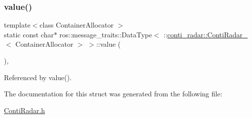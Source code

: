 \subsubsection{\texorpdfstring{value()}{value()}\hspace{0.1cm}{\footnotesize\ttfamily [2/2]}}
{\footnotesize\ttfamily template$<$class Container\+Allocator $>$ \\
static const char$\ast$ ros\+::message\+\_\+traits\+::\+Data\+Type$<$ \+::\hyperlink{structconti__radar_1_1ContiRadar__}{conti\+\_\+radar\+::\+Conti\+Radar\+\_\+}$<$ Container\+Allocator $>$ $>$\+::value (\begin{DoxyParamCaption}\item[{const \+::\hyperlink{structconti__radar_1_1ContiRadar__}{conti\+\_\+radar\+::\+Conti\+Radar\+\_\+}$<$ Container\+Allocator $>$ \&}]{ }\end{DoxyParamCaption})\hspace{0.3cm}{\ttfamily [inline]}, {\ttfamily [static]}}



Referenced by value().



The documentation for this struct was generated from the following file\+:\begin{DoxyCompactItemize}
\item 
\hyperlink{ContiRadar_8h}{Conti\+Radar.\+h}\end{DoxyCompactItemize}
